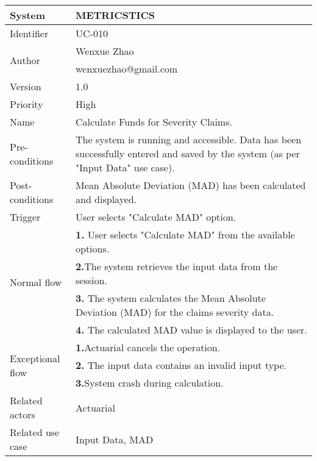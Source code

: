 \begin{table}[htb]
    \centering
     \begin{tabular}{|p{4cm}|p{12cm}|} \hline 
         System &  METRICSTICS\\ \hline 
         
         Identifier & UC-010 \\ \hline 
         
         \multirow{2}{*}{Author} & Wenxue Zhao   \\
         &wenxuezhao@gmail.com \\
           \hline 
           Version & 1.0\\ \hline
         
         Priority &  High\\ \hline 
         
         Name & Calculate Funds for Severity Claims. \\ \hline 
         Pre-conditions & The system is running and accessible.
Data has been successfully entered and saved by the system (as per "Input Data" use case).
 \\ \hline 
         Post-conditions & Mean Absolute Deviation (MAD) has been calculated and displayed. \\ \hline
         Trigger & User selects "Calculate MAD" option. \\ \hline
        \multirow{4}{*}{Normal flow} 
        & \textbf{1.} User selects "Calculate MAD" from the available options. \\ 
        & \textbf{2.}The system retrieves the input data from the session.   \\ 
 & \textbf{3.}  The system calculates the Mean Absolute Deviation (MAD) for the claims severity data. \\ 
 & \textbf{4.} The calculated MAD value is displayed to the user. \\ 
        
         
        
        \hline
        \multirow{3}{*}{Exceptional flow} 
        & \textbf{1.}Actuarial cancels the operation. \\ 
        & \textbf{2.} The input data contains an invalid input type.   \\ 
         & \textbf{3.}System crash during calculation. \\ \hline 
        Related actors & Actuarial \\ \hline
        Related use case & Input Data, MAD  \\ \hline
    \end{tabular}
    \caption{}
    \label{tab:my_label}
\end{table}
